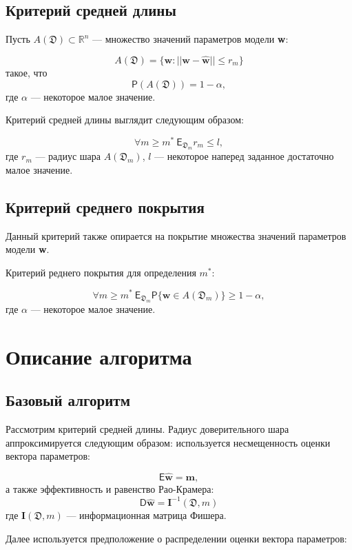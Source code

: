 \documentclass[12pt,twoside]{article}
\begin{document}
\subsection{Критерий средней длины}

Пусть $A(\mathfrak{D}) \subset \mathbb{R}^n$ --- множество значений параметров модели \textbf{w}:

$$
A(\mathfrak{D}) = \{\textbf{w} : ||\textbf{w}- \hat{\textbf{w}}|| \leqslant r_m\}
$$
такое, что
$$
\mathsf{P}(A(\mathfrak{D})) = 1 - \alpha,
$$
где $\alpha$ --- некоторое малое значение. 

Критерий средней длины выглядит следующим образом:

$$
\forall m \geqslant  m^{*}~\mathsf{E}_{\mathfrak D_m} r_m \leqslant l , 
$$
где $r_m$ --- радиус шара $A(\mathfrak{D}_m)$, $l$ --- некоторое наперед заданное достаточно малое значение.

\subsection{Критерий среднего покрытия}

Данный критерий также опирается на покрытие множества значений параметров модели \textbf{w}.

Критерий реднего покрытия для определения $m^{*}$:

$$
\forall m \geqslant m^{*}~\mathsf{E}_{\mathfrak D_m} \mathsf{P}\{\textbf{w} \in A(\mathfrak D_m)\} \geqslant 1 - \alpha,
$$
где $\alpha$ --- некоторое малое значение.

\section{Описание алгоритма}

\subsection{Базовый алгоритм}

Рассмотрим критерий средней длины. Радиус доверительного шара аппроксимируется следующим образом: используется несмещенность оценки вектора параметров:

$$
\mathsf{E}\hat{\textbf{w}} = \textbf{m},
$$
а также эффективность и равенство Рао-Крамера:
$$
\mathsf{D}\hat{\textbf{w}} = \textbf{I}^{-1}(\mathfrak D, m)
$$
где $\textbf{I}(\mathfrak{D}, m)$ --- информационная матрица Фишера.

Далее используется предположение о распределении оценки вектора параметров:
\end{document}
